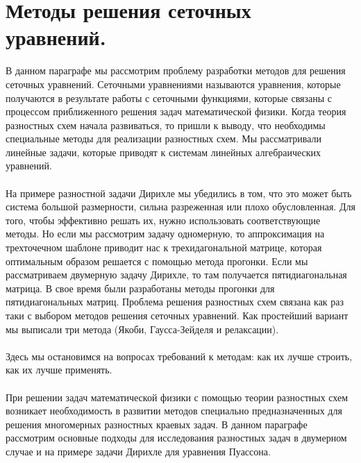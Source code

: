 \documentclass[a4paper, 12pt]{report}
\numberwithin{equation}{section}
\begin{document}
	\section{Методы решения сеточных уравнений.}
	В данном параграфе мы рассмотрим проблему разработки методов для решения сеточных уравнений. Сеточными уравнениями называются уравнения, которые получаются в результате работы с сеточными функциями, которые связаны с процессом приближенного решения задач математической физики. Когда теория разностных схем начала развиваться, то пришли к выводу, что необходимы специальные методы для реализации разностных схем. 
	Мы рассматривали линейные задачи, которые приводят к системам линейных алгебраических уравнений.
	\\\\
	На примере разностной задачи Дирихле мы убедились в том, что это может быть система большой размерности, сильна разреженная или плохо обусловленная. Для того, чтобы эффективно решать их, нужно использовать соответствующие методы. Но если мы рассмотрим задачу одномерную, то аппроксимация на трехточечном шаблоне приводит нас к трехидагональной матрице, которая оптимальным образом решается с помощью метода прогонки. Если мы рассматриваем двумерную задачу Дирихле, то там получается пятидиагональная матрица. В свое время были разработаны методы прогонки для пятидиагональных матриц. 
	Проблема решения разностных схем связана как раз таки с выбором методов решения сеточных уравнений. Как простейший вариант мы выписали три метода (Якоби, Гаусса-Зейделя и релаксации). 
	\\\\
	Здесь мы остановимся на вопросах требований к методам: как их лучше строить, как их лучше применять.\\\\
	При решении задач математической физики с помощью теории разностных схем возникает необходимость в развитии методов специально предназначенных для решения многомерных разностных краевых задач. В данном параграфе рассмотрим основные подходы для исследования разностных задач в двумерном случае и на примере задачи Дирихле для уравнения Пуассона.
\end{document}

